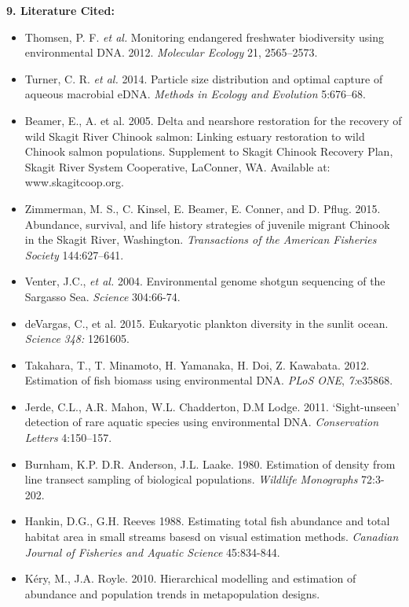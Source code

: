 \documentclass[]{article}
\providecommand{\tightlist}{%
  \setlength{\itemsep}{0pt}\setlength{\parskip}{0pt}}
\begin{document}
\textbf{9. Literature Cited:}

\begin{itemize}
\tightlist
\item
  Thomsen, P. F. \emph{et al.} Monitoring endangered freshwater
  biodiversity using environmental DNA. 2012. \emph{Molecular Ecology}
  21, 2565--2573.
\item
  Turner, C. R. \emph{et al.} 2014. Particle size distribution and
  optimal capture of aqueous macrobial eDNA. \emph{Methods in Ecology
  and Evolution} 5:676--68.
\item
  Beamer, E., A. et al. 2005. Delta and nearshore restoration for the
  recovery of wild Skagit River Chinook salmon: Linking estuary
  restoration to wild Chinook salmon populations. Supplement to Skagit
  Chinook Recovery Plan, Skagit River System Cooperative, LaConner, WA.
  Available at: www.skagitcoop.org.
\item
  Zimmerman, M. S., C. Kinsel, E. Beamer, E. Conner, and D. Pflug. 2015.
  Abundance, survival, and life history strategies of juvenile migrant
  Chinook in the Skagit River, Washington. \emph{Transactions of the
  American Fisheries Society} 144:627--641.
\item
  Venter, J.C., \emph{et al.} 2004. Environmental genome shotgun
  sequencing of the Sargasso Sea. \emph{Science} 304:66-74.
\item
  deVargas, C., et al. 2015. Eukaryotic plankton diversity in the sunlit
  ocean. \emph{Science} \emph{348:} 1261605.
\item
  Takahara, T., T. Minamoto, H. Yamanaka, H. Doi, Z. Kawabata. 2012.
  Estimation of fish biomass using environmental DNA. \emph{PLoS ONE},
  \emph{7:}e35868.
\item
  Jerde, C.L., A.R. Mahon, W.L. Chadderton, D.M Lodge. 2011.
  `Sight-unseen' detection of rare aquatic species using environmental
  DNA. \emph{Conservation Letters} 4:150--157.
\item
  Burnham, K.P. D.R. Anderson, J.L. Laake. 1980. Estimation of density
  from line transect sampling of biological populations. \emph{Wildlife
  Monographs} 72:3-202.
\item
  Hankin, D.G., G.H. Reeves 1988. Estimating total fish abundance and
  total habitat area in small streams basesd on visual estimation
  methods. \emph{Canadian Journal of Fisheries and Aquatic Science}
  45:834-844.
\item
  Kéry, M., J.A. Royle. 2010. Hierarchical modelling and estimation of
  abundance and population trends in metapopulation designs.

\end{itemize}
\end{document}
